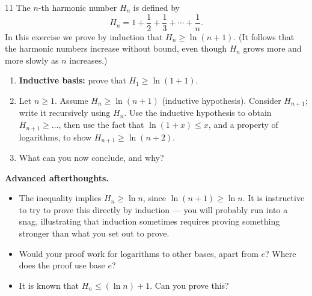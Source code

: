 \documentclass[11pt]{article}
\begin{document}
\begin{exercise}{11}
    The $n$-th harmonic number $H_n$ is defined by
    \[
        H_n = 1 + \frac{1}{2} + \frac{1}{3} + \cdots + \frac{1}{n}.
    \]
    In this exercise we prove by induction that $H_n \ge \ln(n+1)$.
    (It follows that the harmonic numbers increase without bound, even
    though $H_n$ grows more and more slowly as $n$ increases.)
    \begin{enumerate}[label=(\roman*)]
        \item \textbf{Inductive basis:} prove that $H_1 \ge \ln(1+1)$.
        \item Let $n \ge 1$. Assume $H_n \ge \ln(n+1)$ (inductive
            hypothesis). Consider $H_{n+1}$; write it recursively
            using $H_n$. Use the inductive hypothesis to obtain
            $H_{n+1} \ge \dots$, then use the fact that $\ln(1+x) \le
            x$, and a property of logarithms, to show
            $H_{n+1} \ge \ln(n+2)$.
        \item What can you now conclude, and why?
    \end{enumerate}
    \textbf{Advanced afterthoughts.}
    \begin{itemize}
        \item The inequality implies $H_n \ge \ln n$, since
            $\ln(n+1) \ge \ln n$. It is instructive to try to prove
            this directly by induction --- you will probably run into
            a snag, illustrating that induction sometimes requires
            proving something stronger than what you set out to
            prove.
        \item Would your proof work for logarithms to other bases,
            apart from $e$? Where does the proof use base $e$?
        \item It is known that $H_n \le (\ln n) + 1$. Can you prove
            this?
    \end{itemize}
\end{exercise}
\end{document}
